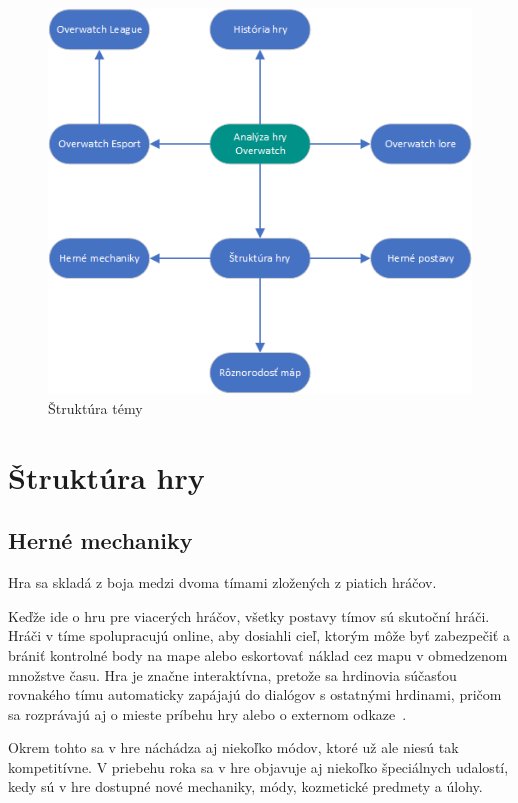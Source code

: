 \documentclass[10pt,oneside,slovak,a4paper]{article}
\begin{document}
\begin{figure}[h!]
\includegraphics[scale=1]{images/struktura_temy.png}
\caption{Štruktúra témy}
\end{figure}


\section{Štruktúra hry} \label{Herné mechaniky}

\subsection{Herné mechaniky} \label{Herné mechaniky}


Hra sa skladá z boja medzi dvoma tímami zložených z piatich hráčov. 

Keďže ide o hru pre viacerých hráčov, všetky postavy tímov sú skutoční hráči. Hráči v tíme spolupracujú online, aby dosiahli cieľ, ktorým môže byť zabezpečiť a brániť kontrolné body na mape alebo eskortovať náklad cez mapu v obmedzenom množstve času. Hra je značne interaktívna, pretože sa hrdinovia súčasťou rovnakého tímu automaticky zapájajú do dialógov s ostatnými hrdinami, pričom sa rozprávajú aj o mieste príbehu hry alebo o externom odkaze~\cite{Overwatchbook}.

Okrem tohto sa v hre náchádza aj niekoľko módov, ktoré už ale niesú tak kompetitívne. V priebehu roka sa v hre objavuje aj niekoľko špeciálnych udalostí,
 kedy sú v hre dostupné nové mechaniky, módy, kozmetické predmety a úlohy.
\end{document}

